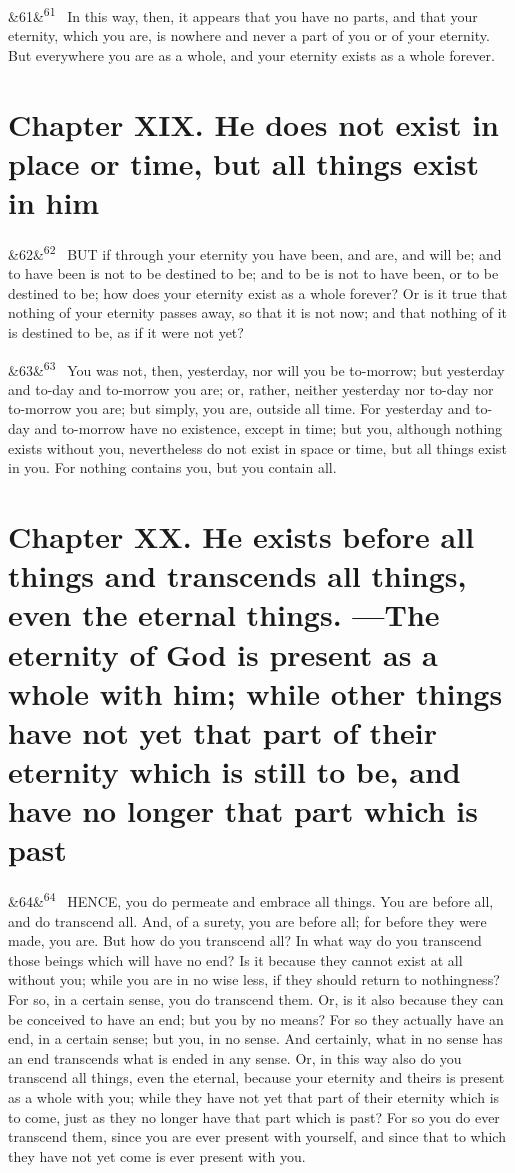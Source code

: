 \documentclass[12pt]{article}
\newcommand{\para}[1][]{\par\noindent\ifx&#1&\else\textsuperscript{\footnotesize #1}~\fi}
\begin{document}
\para[61] In this way, then, it appears that you have no parts, and that your eternity, which you are, is nowhere and never a part of you or of your eternity. But everywhere you are as a whole, and your eternity exists as a whole forever.


\section*{Chapter XIX. He does not exist in place or time, but all things exist in him}

\para[62] BUT if through your eternity you have been, and are, and will be; and to have been is not to be destined to be; and to be is not to have been, or to be destined to be; how does your eternity exist as a whole forever? Or is it true that nothing of your eternity passes away, so that it is not now; and that nothing of it is destined to be, as if it were not yet?

\para[63] You was not, then, yesterday, nor will you be to-morrow; but yesterday and to-day and to-morrow you are; or, rather, neither yesterday nor to-day nor to-morrow you are; but simply, you are, outside all time. For yesterday and to-day and to-morrow have no existence, except in time; but you, although nothing exists without you, nevertheless do not exist in space or time, but all things exist in you. For nothing contains you, but you contain all.


\section*{Chapter XX. He exists before all things and transcends all things, even the eternal things. ---The eternity of God is present as a whole with him; while other things have not yet that part of their eternity which is still to be, and have no longer that part which is past}

\para[64] HENCE, you do permeate and embrace all things. You are before all, and do transcend all. And, of a surety, you are before all; for before they were made, you are. But how do you transcend all? In what way do you transcend those beings which will have no end? Is it because they cannot exist at all without you; while you are in no wise less, if they should return to nothingness? For so, in a certain sense, you do transcend them. Or, is it also because they can be conceived to have an end; but you by no means? For so they actually have an end, in a certain sense; but you, in no sense. And certainly, what in no sense has an end transcends what is ended in any sense. Or, in this way also do you transcend all things, even the eternal, because your eternity and theirs is present as a whole with you; while they have not yet that part of their eternity which is to come, just as they no longer have that part which is past? For so you do ever transcend them, since you are ever present with yourself, and since that to which they have not yet come is ever present with you.
\end{document}

